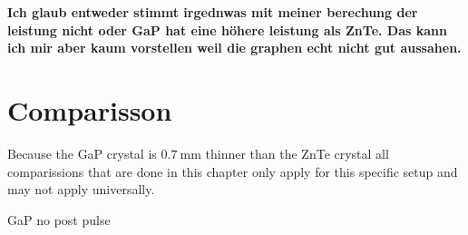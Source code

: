 \textbf{Ich glaub entweder stimmt irgednwas mit meiner berechung der leistung nicht oder GaP hat eine höhere leistung als ZnTe.
Das kann ich mir aber kaum vorstellen weil die graphen echt nicht gut aussahen.}




\FloatBarrier






\section{Comparisson}
Because the GaP crystal is $\SI{0.7}{\milli\meter}$ thinner than the ZnTe crystal all comparissions that are done in this chapter only apply for this specific setup and may not apply universally.


GaP no post pulse
